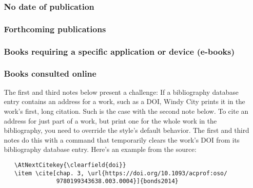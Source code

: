 \documentclass[11pt,letterpaper,oneside]{article}
\begin{document}
\subsubsection{No date of publication}

\begin{bibonly}
\nocite{boston,edinburgh1750,edinburgh}
\end{bibonly}

\subsubsection{Forthcoming publications}
\label{14.146}

\begin{citebib}
\item \cite{author}
\item \cite[345--46]{writer}
\item \cite{contributor}
\end{citebib}

\setcounter{subsubsection}{158}
\subsubsection{Books requiring a specific application or device (e-books)}

\begin{citebib}
\item \cite{borel2015}
\end{citebib}

\setcounter{subsubsection}{160}
\subsubsection{Books consulted online}

The first and third notes below present a challenge: If a bibliography
database entry contains an address for a work, such as a DOI, Windy
City prints it in the work's first, long citation. Such is the case
with the second note below. To cite an address for just part of a
work, but print one for the whole work in the bibliography, you need
to override the style's default behavior. The first and third notes do
this with a command that temporarily clears the work's DOI from its
bibliography database entry. Here's an example from the source:

\begin{verbatim}
   \AtNextCitekey{\clearfield{doi}}
   \item \cite[chap. 3, \url{https://doi.org/10.1093/acprof:oso/
               9780199343638.003.0004}]{bonds2014}
\end{verbatim}
\end{document}
